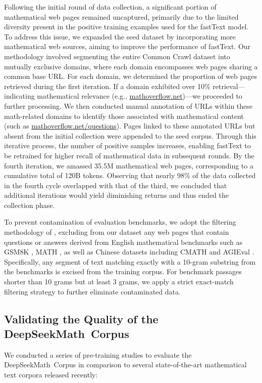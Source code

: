 \begin{itemize}[topsep=0pt]
Following the initial round of data collection, a significant portion of mathematical web pages remained uncaptured, primarily due to the limited diversity present in the positive training examples used for the fastText model. To address this issue, we expanded the seed dataset by incorporating more mathematical web sources, aiming to improve the performance of fastText. Our methodology involved segmenting the entire Common Crawl dataset into mutually exclusive domains, where each domain encompasses web pages sharing a common base URL. For each domain, we determined the proportion of web pages retrieved during the first iteration. If a domain exhibited over 10\% retrieval—indicating mathematical relevance (e.g., \url{mathoverflow.net})—we proceeded to further processing. We then conducted manual annotation of URLs within these math-related domains to identify those associated with mathematical content (such as \url{mathoverflow.net/questions}). Pages linked to these annotated URLs but absent from the initial collection were appended to the seed corpus. Through this iterative process, the number of positive samples increases, enabling fastText to be retrained for higher recall of mathematical data in subsequent rounds. By the fourth iteration, we amassed 35.5M mathematical web pages, corresponding to a cumulative total of 120B tokens. Observing that nearly 98\% of the data collected in the fourth cycle overlapped with that of the third, we concluded that additional iterations would yield diminishing returns and thus ended the collection phase.

To prevent contamination of evaluation benchmarks, we adopt the filtering methodology of \cite{deepseek-coder}, excluding from our dataset any web pages that contain questions or answers derived from English mathematical benchmarks such as GSM8K \citep{gsm8k}, MATH \citep{MATH}, as well as Chinese datasets including CMATH \citep{wei2023cmath} and AGIEval \citep{agieval}. Specifically, any segment of text matching exactly with a 10-gram substring from the benchmarks is excised from the training corpus. For benchmark passages shorter than 10 grams but at least 3 grams, we apply a strict exact-match filtering strategy to further eliminate contaminated data.

\subsection{Validating the Quality of the DeepSeekMath~Corpus}

We conducted a series of pre-training studies to evaluate the DeepSeekMath~Corpus in comparison to several state-of-the-art mathematical text corpora released recently:


\end{itemize}
